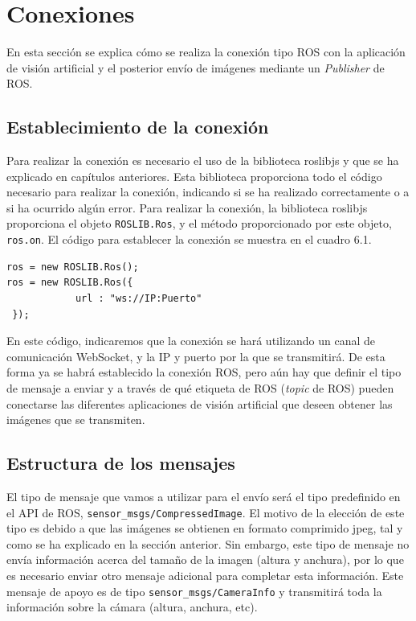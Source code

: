 \section{Conexiones}
En esta sección se explica cómo se realiza la conexión tipo ROS con la aplicación de visión artificial y el posterior envío de imágenes mediante un \textit{Publisher} de ROS. 

\subsection{Establecimiento de la conexión}
Para realizar la conexión es necesario el uso de la biblioteca roslibjs y que se ha explicado en capítulos anteriores. Esta biblioteca proporciona todo el código necesario para realizar la conexión, indicando si se ha realizado correctamente o a si ha ocurrido algún error. Para realizar la conexión, la biblioteca roslibjs proporciona el objeto \texttt{ROSLIB.Ros}, y el método proporcionado por este objeto, \texttt{ros.on}. El código para establecer la conexión se muestra en el cuadro 6.1.
\begin{lstlisting}[caption= Establecer conexión con ROS, label=cod.conexionRosCamserver]
ros = new ROSLIB.Ros();
ros = new ROSLIB.Ros({
            url : "ws://IP:Puerto"
 });
\end{lstlisting}
En este código, indicaremos que la conexión se hará utilizando un canal de comunicación WebSocket, y la IP y puerto por la que se transmitirá. De esta forma ya se habrá establecido la conexión ROS, pero aún hay que definir el tipo de mensaje a enviar y a través de qué etiqueta de ROS (\textit{topic} de ROS) pueden conectarse las diferentes aplicaciones de visión artificial que deseen obtener las imágenes que se transmiten.

\subsection{Estructura de los mensajes}
El tipo de mensaje que vamos a utilizar para el envío será el tipo predefinido en el API de ROS, \texttt{sensor\_msgs/CompressedImage}. El motivo de la elección de este tipo es debido a que las imágenes se obtienen en formato comprimido jpeg, tal y como se ha explicado en la sección anterior. Sin embargo, este tipo de mensaje no envía información acerca del tamaño de la imagen (altura y anchura), por lo que es necesario enviar otro mensaje adicional para completar esta información. Este mensaje de apoyo es de tipo \texttt{sensor\_msgs/CameraInfo} y transmitirá toda la información sobre la cámara (altura, anchura, etc). 

